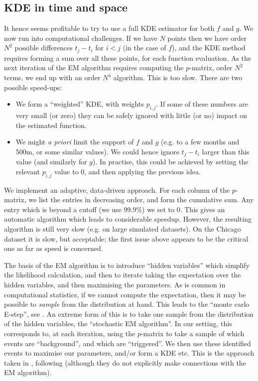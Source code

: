 \documentclass[twoside,a4paper]{article}
\theoremstyle{plain}
\theoremstyle{definition}
\begin{document}
\subsection{KDE in time and space}\label{sec:kde_time_space}

It hence seems profitable to try to use a full KDE estimator for both $f$ and $g$.
We now run into computational challenges.  If we have $N$ points then we have order $N^2$
possible differences $t_j-t_i$ for $i<j$ (in the case of $f$),
and the KDE method requires forming a sum
over all these points, for each function evaluation.  As the next iteration of the EM algorithm
requires computing the $p$-matrix, order $N^2$ terms, we end up with an order $N^4$ algorithm.
This is too slow.  There are two possible speed-ups:
\begin{itemize}
\item We form a ``weighted'' KDE, with weights $p_{i,j}$.  If some of these numbers are
very small (or zero) they can be safely ignored with little (or no) impact on the estimated
function.
\item We might \emph{a priori} limit the support of $f$ and $g$ (e.g. to a few months and 500m,
or some similar values).  We could hence ignore $t_j - t_i$ larger than this value (and similarly
for $g$).  In practise, this could be achieved by setting the relevant $p_{i,j}$ value to $0$,
and then applying the previous idea.
\end{itemize}

We implement an adaptive, data-driven approach.  For each column
of the $p$-matrix, we list the entries in decreasing order, and form the cumulative sum.  Any
entry which is beyond a cutoff (we use 99.9\%) we set to 0.  This gives an automatic algorithm
which leads to considerable speedup.  However, the resulting algorithm is still very slow
(e.g. on large simulated datasets).
On the Chicago dataset it is slow, but acceptable; the first issue above appears to be the
critical one as far as speed is concerned.

The basis of the EM algorithm is to introduce ``hidden variables'' which simplify the likelihood
calculation, and then to iterate taking the expectation over the hidden variables, and then
maximising the parameters.  As is common in computational statistics, if we cannot compute the
expectation, then it may be possible to \emph{sample} from the distribution at hand.  This leads
to the ``monte carlo E-step'', see \cite[Chapter~6]{mk}.  An extreme form of this is to take one
sample from the distribution of the hidden variables, the ``stochastic EM algorithm''.  In our
setting, this corresponds to, at each iteration, using the $p$-matrix to take a sample of which
events are ``background'', and which are ``triggered''.  We then use these identified events
to maximise our parameters, and/or form a KDE etc.  This is the approach taken in \cite{sepp2},
following \cite{zovj} (although they do not explicitly make connections with the EM algorithm).
\end{document}
